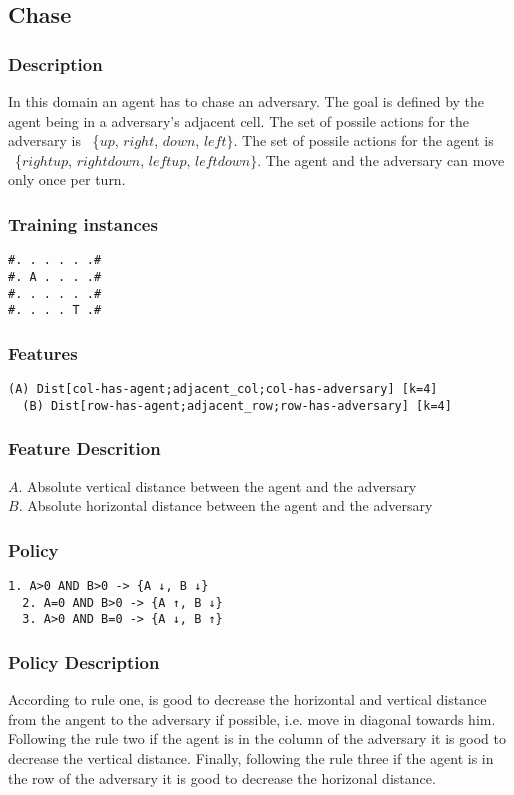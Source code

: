 \documentclass[a4paper]{article}
\begin{document}
\subsection{Chase}
\subsubsection{Description}
In this domain an agent has to chase an adversary. The goal is defined by the agent being in a adversary's adjacent cell. The set of possile actions for the adversary is ~\{$up$, $right$, $down$, $left\}$. The set of possile actions for the agent is ~\{$rightup$, $rightdown$, $leftup$, $leftdown\}$. The agent and the adversary can move only once per turn.

\subsubsection{Training instances}
\begin{Verbatim}[fontsize=\footnotesize]
#. . . . . .#
#. A . . . .#
#. . . . . .#
#. . . . T .#
\end{Verbatim}

\subsubsection{Features}
\begin{Verbatim}[fontsize=\footnotesize]
  (A) Dist[col-has-agent;adjacent_col;col-has-adversary] [k=4]
  (B) Dist[row-has-agent;adjacent_row;row-has-adversary] [k=4]
\end{Verbatim}

\subsubsection{Feature Descrition}
$A$. Absolute vertical distance between the agent and the adversary\\
$B$. Absolute horizontal distance between the agent and the adversary
\subsubsection{Policy}

\begin{Verbatim}[fontsize=\footnotesize]
  1. A>0 AND B>0 -> {A ↓, B ↓}
  2. A=0 AND B>0 -> {A ↑, B ↓}
  3. A>0 AND B=0 -> {A ↓, B ↑}
\end{Verbatim}

\subsubsection{Policy Description}
According to rule one, is good to decrease the horizontal and vertical distance from the angent to the adversary if possible, i.e. move in diagonal towards him. Following the rule two if the agent is in the column of the adversary it is good to decrease the vertical distance. Finally, following the rule three if the agent is in the row of the adversary it is good to decrease the horizonal distance.
\end{document}
